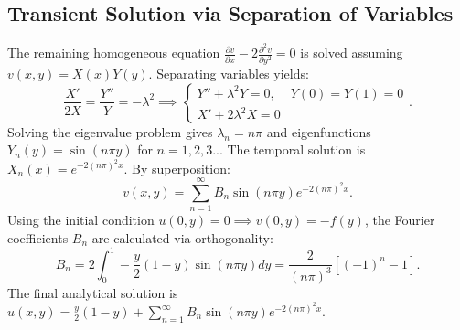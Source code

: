 \documentclass[11pt]{article}
\begin{document}
\subsection{Transient Solution via Separation of Variables}
The remaining homogeneous equation $\frac{\partial v}{\partial x} - 2\frac{\partial^2 v}{\partial y^2} = 0$ is solved assuming
 $v(x,y) = X(x)Y(y)$. Separating variables yields:
\begin{equation*}
    \frac{X'}{2X} = \frac{Y''}{Y} = -\lambda^2 \implies 
    \begin{cases} 
    Y'' + \lambda^2 Y = 0, & Y(0)=Y(1)=0 \\
    X' + 2\lambda^2 X = 0
    \end{cases}.
\end{equation*}
Solving the eigenvalue problem gives $\lambda_n = n\pi$ and eigenfunctions $Y_n(y) = \sin(n\pi y)$ for $n=1,2,3..$. The temporal
solution is $X_n(x) = e^{-2(n\pi)^2x}$. By superposition:
\begin{equation*}
    v(x,y) = \sum_{n=1}^\infty B_n \sin(n\pi y) e^{-2(n\pi)^2x}.
\end{equation*}
Using the initial condition $u(0,y)=0 \implies v(0,y) = -f(y)$, the Fourier coefficients $B_n$ are calculated via orthogonality:
\begin{equation*}
    B_n = 2 \int_0^1 -\frac{y}{2}(1-y) \sin(n\pi y) dy = \frac{2}{(n\pi)^3} [(-1)^n - 1].
\end{equation*}
The final analytical solution is $u(x,y) = \frac{y}{2}(1-y) + \sum_{n=1}^\infty B_n \sin(n\pi y) e^{-2(n\pi)^2x}$.
\end{document}

